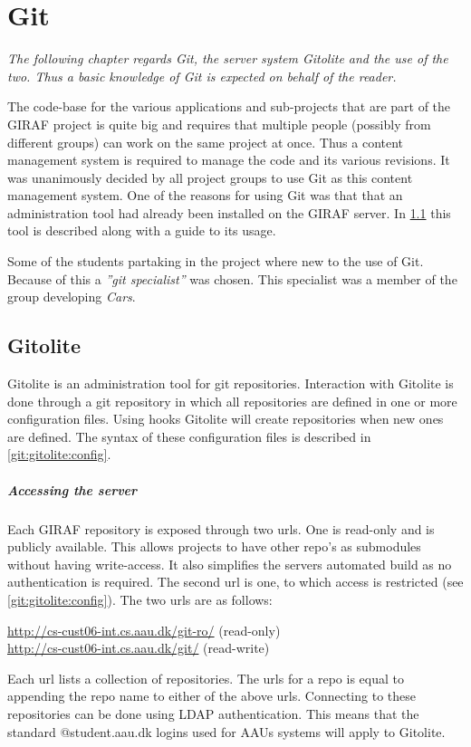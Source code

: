 \chapter{Git}
\newcommand{\git}{Git}\newcommand{\Git}{Git}
\newcommand{\gitolite}{Gitolite}\newcommand{\Gitolite}{Gitolite}
\begin{center}
\textit{The following chapter regards \git{}, the server system \gitolite{} and the use of the two.
Thus a basic knowledge of \git{} is expected on behalf of the reader.}
\end{center}
The code-base for the various applications and sub-projects that are part of the GIRAF project is quite big and requires that multiple people (possibly from different groups) can work on the same project at once.
Thus a content management system is required to manage the code and its various revisions. 
It was unanimously decided by all project groups to use \git{} as this content management system.
One of the reasons for using \git{} was that that an administration tool had already been installed on the GIRAF server.
In \cref{git:gitolite} this tool is described along with a guide to its usage.

Some of the students partaking in the project where new to the use of \git{}.
Because of this a \textit{''git specialist''} was chosen.
This specialist was a member of the group developing \textit{Cars}.

\section{\Gitolite{}}\label{git:gitolite}
\Gitolite{} is an administration tool for git repositories.
Interaction with \gitolite{} is done through a git repository in which all repositories are defined in one or more configuration files.
Using hooks \gitolite{} will create repositories when new ones are defined.
The syntax of these configuration files is described in \cref{git:gitolite:config}.

\paragraph{Accessing the server}
Each GIRAF repository is exposed through two urls.
One is read-only and is publicly available.
This allows projects to have other repo's as submodules without having write-access.
It also simplifies the servers automated build as no authentication is required.
The second url is one, to which access is restricted (see \cref{git:gitolite:config}).
The two urls are as follows:
\begin{center}
\url{http://cs-cust06-int.cs.aau.dk/git-ro/} (read-only)\\
\url{http://cs-cust06-int.cs.aau.dk/git/} (read-write)
\end{center}
Each url lists a collection of repositories.
The urls for a repo is equal to appending the repo name to either of the above urls.
Connecting to these repositories can be done using LDAP authentication.
This means that the standard @student.aau.dk logins used for AAUs systems will apply to \gitolite{}.

